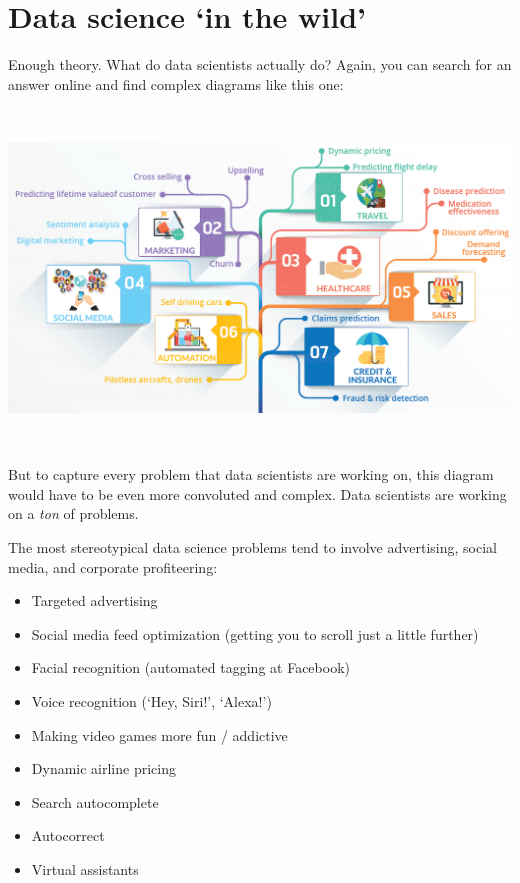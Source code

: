 \documentclass[
]{book}
\providecommand{\tightlist}{%
  \setlength{\itemsep}{0pt}\setlength{\parskip}{0pt}}
\begin{document}
\hypertarget{data-science-in-the-wild}{%
\section*{Data science `in the wild'}\label{data-science-in-the-wild}}

Enough theory. What do data scientists actually do? Again, you can search for an answer online and find complex diagrams like this one:

~

\includegraphics{img/venn4.png}

~

But to capture every problem that data scientists are working on, this diagram would have to be even more convoluted and complex.
Data scientists are working on a \emph{ton} of problems.

The most stereotypical data science problems tend to involve advertising, social media, and corporate profiteering:

\begin{itemize}
\tightlist
\item
  Targeted advertising\\
\item
  Social media feed optimization (getting you to scroll just a little further)
\item
  Facial recognition (automated tagging at Facebook)
\item
  Voice recognition (`Hey, Siri!', `Alexa!')
\item
  Making video games more fun / addictive\\
\item
  Dynamic airline pricing\\
\item
  Search autocomplete\\
\item
  Autocorrect\\
\item
  Virtual assistants
\end{itemize}
\end{document}
